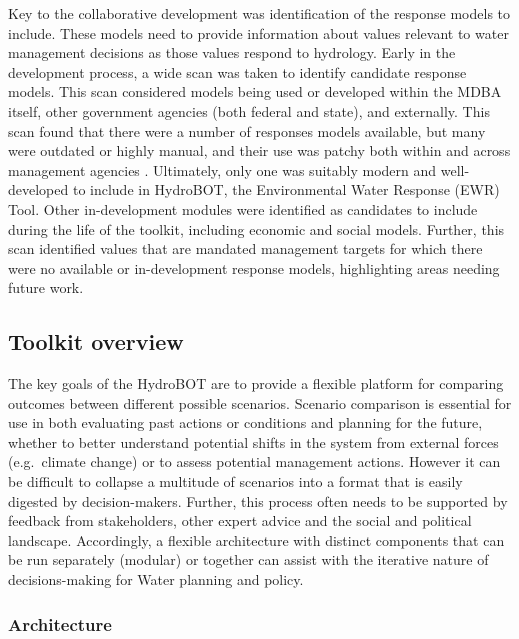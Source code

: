 \documentclass[
  number]{elsarticle}
\begin{document}
Key to the collaborative development was identification of the response
models to include. These models need to provide information about values
relevant to water management decisions as those values respond to
hydrology. Early in the development process, a wide scan was taken to
identify candidate response models. This scan considered models being
used or developed within the MDBA itself, other government agencies
(both federal and state), and externally. This scan found that there
were a number of responses models available, but many were outdated or
highly manual, and their use was patchy both within and across
management agencies \citep{holt2022}. Ultimately, only one was suitably
modern and well-developed to include in HydroBOT, the Environmental
Water Response (EWR) Tool. Other in-development modules were identified
as candidates to include during the life of the toolkit, including
economic and social models. Further, this scan identified values that
are mandated management targets for which there were no available or
in-development response models, highlighting areas needing future work.

\hypertarget{toolkit-overview}{%
\subsection{Toolkit overview}\label{toolkit-overview}}

The key goals of the HydroBOT are to provide a flexible platform for
comparing outcomes between different possible scenarios. Scenario
comparison is essential for use in both evaluating past actions or
conditions and planning for the future, whether to better understand
potential shifts in the system from external forces (e.g.~climate
change) or to assess potential management actions. However it can be
difficult to collapse a multitude of scenarios into a format that is
easily digested by decision-makers. Further, this process often needs to
be supported by feedback from stakeholders, other expert advice and the
social and political landscape. Accordingly, a flexible architecture
with distinct components that can be run separately (modular) or
together can assist with the iterative nature of decisions-making for
Water planning and policy.

\hypertarget{architecture}{%
\subsubsection{Architecture}\label{architecture}}
\end{document}

